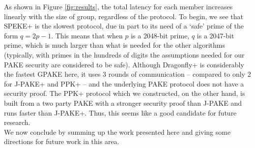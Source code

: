 As shown in Figure \ref{fig:results}, the total latency for each member increases linearly with the size of group, regardless of the protocol.  To begin, we see that SPEKE+ is the slowest protocol, due in part to its need of a `safe' prime of the form $q = 2p-1$.  This means that when $p$ is a 2048-bit prime, $q$ is a 2047-bit prime, which is much larger than what is needed for the other algorithms (typically, with primes in the hundreds of digits the assumptions needed for our PAKE security are considered to be safe).  Although Dragonfly+ is considerably the fastest GPAKE here, it uses 3 rounds of communication -- compared to only 2 for J-PAKE+ and PPK+ -- and the underlying PAKE protocol does not have a security proof.  The PPK+ protocol which we constructed, on the other hand, is built from a two party PAKE with a stronger security proof than J-PAKE and runs faster than J-PAKE+.  Thus, this seems like a good candidate for future research.
\\

We now conclude by summing up the work presented here and giving some directions for future work in this area.

